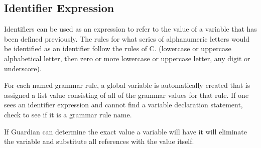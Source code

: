 
\subsection{Identifier Expression}
{
	Identifiers can be used as an expression to refer to the value
	of a variable that has been defined previously. The rules for what series
	of alphanumeric letters would be identified as an identifier follow the
	rules of C. (lowercase or uppercase alphabetical letter, then zero or more
	lowercase or uppercase letter, any digit or underscore).
	
	For each named grammar rule, a global variable is automatically created
	that is assigned a list value consisting of all of the grammar values
	for that rule. If one sees an identifier expression and cannot find
	a variable declaration statement, check to see if it is a grammar rule name.
	
	If Guardian can determine the exact value a variable will
	have it will eliminate
	the variable and substitute all references with the value itself.
}
